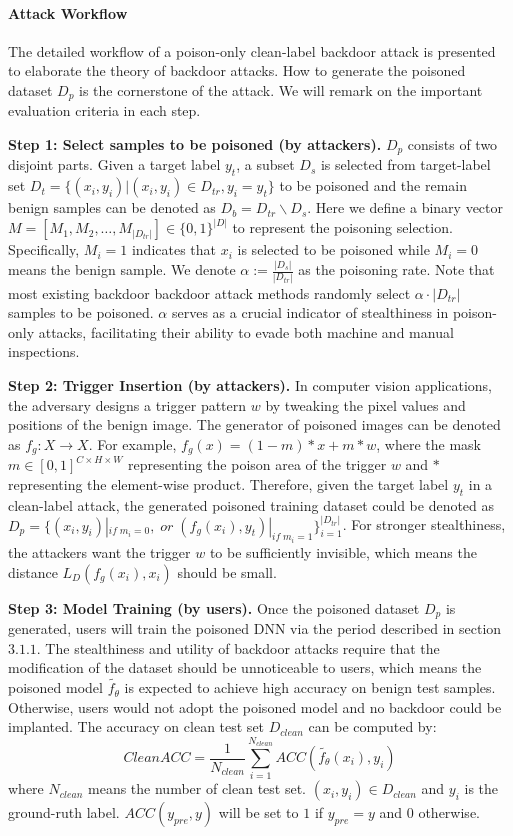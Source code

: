 \documentclass{article}
\begin{document}
\paragraph{Attack Workflow}
The detailed workflow of a poison-only clean-label backdoor attack is presented to elaborate the theory of backdoor attacks. How to generate the poisoned dataset \(D_{p}\) is the cornerstone of the attack. We will remark on the important evaluation criteria in each step.

\textbf{Step 1: Select samples to be poisoned (by attackers).} \(D_{p}\) consists of two disjoint parts. Given a target label \(y_t\), a subset \(D_s\) is selected from target-label set \(D_t = \{(x_i, y_i)| (x_i, y_i) \in D_{tr}, y_i = y_t\}\) to be poisoned and the remain benign samples can be denoted as \(D_b = D_{tr} \backslash D_s\). Here we define a binary vector \(M = [M_1,M_2,\ldots,M_{|D_{tr}|}] \in \{0,1\}^{|D|}\) to represent the poisoning selection. Specifically, \(M_i=1\) indicates that \(x_i\) is selected to be poisoned while \(M_i = 0\) means the benign sample. We denote \(\alpha := \frac{|D_s|}{|D_{tr}|}\) as the poisoning rate. Note that most existing backdoor backdoor attack methods randomly select \(\alpha \cdot |D_{tr}|\) samples to be poisoned. \(\alpha\) serves as a crucial indicator of stealthiness in poison-only attacks, facilitating their ability to evade both machine and manual inspections. 

\textbf{Step 2: Trigger Insertion (by attackers).}  In computer vision applications, the adversary designs a trigger pattern \(w\) by tweaking the pixel values and positions of the benign image. The generator of poisoned images can be denoted as \(f_g:X \to X\). For example, \(f_g(x) = (1-m)*x + m*w\), where the mask \(m \in [0,1]^{C \times H \times W }\) representing the poison area of the trigger \(w\) and \(*\) representing the element-wise product. Therefore, given the target label \(y_t\) in a clean-label attack, the generated poisoned training dataset could be denoted as \(D_p = \{(x_i,y_i)|_{if\;m_i = 0}, \; or \;(f_g(x_i), y_t)|_{if\;m_i = 1}\}_{i=1}^{|D_{tr}|}\). For stronger stealthiness, the attackers want the trigger \(w\) to be sufficiently invisible, which means the distance \(L_D(f_g(x_i),x_i)\) should be small.

\textbf{Step 3: Model Training (by users).} Once the poisoned dataset \(D_p\) is generated, users will train the poisoned DNN via the period described in section \(3.1.1\). The stealthiness and utility of backdoor attacks require that the modification of the dataset should be unnoticeable to users, which means the poisoned model \(\tilde{f_{\theta}}\) is expected to achieve high accuracy on benign test samples. Otherwise, users would not adopt the poisoned model and no backdoor could be implanted. The accuracy on clean test set \(D_{clean}\) can be computed by:
\begin{equation}
CleanACC = \frac{1}{N_{clean}}\sum_{i=1}^{N_{clean}}{ACC(\tilde{f_{\theta}}(x_i),y_i)}
\end{equation}
where \(N_{clean}\) means the number of clean test set. \((x_i,y_i) \in D_{clean}\) and \(y_i\) is the ground-ruth label. \(ACC(y_{pre},y)\) will be set to \(1\) if \(y_{pre} = y\) and \(0\) otherwise.
\end{document}
